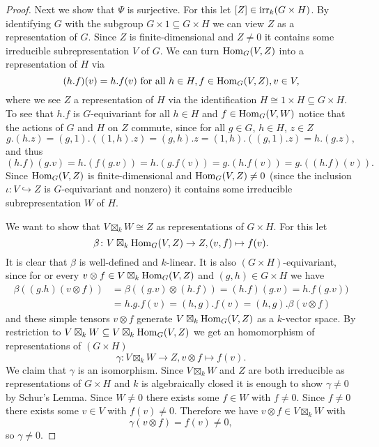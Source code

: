 \begin{proof}
  Next we show that $\Psi$ is surjective.
  For this let $[Z] \in \operatorname{irr}_k(G \times H)$.
  By identifying $G$ with the subgroup $G \times 1 \subseteq G \times H$ we can view $Z$ as a representation of $G$.
  Since $Z$ is finite-dimensional and $Z \neq 0$ it contains some irreducible subrepresentation $V$ of $G$.
  We can turn $\operatorname{Hom}_G(V, Z)$ into a representation of $H$ via
  \[
      (h.f)(v)
    = h.f(v)
    \text{ for all }
    h \in H,
    f \in \operatorname{Hom}_G(V, Z),
    v \in V,
  \]
  where we see $Z$ a representation of $H$ via the identification $H \cong 1 \times H \subseteq G \times H$.
  To see that $h.f$ is $G$-equivariant for all $h \in H$ and $f \in \operatorname{Hom}_G(V,W)$ notice that the actions of $G$ and $H$ on $Z$ commute, since for all $g \in G$, $h \in H$, $z \in Z$
  \[
      g.(h.z)
    = (g,1).((1,h).z)
    = (g,h).z
    = (1,h).((g,1).z)
    = h.(g.z),
  \]
  and thus
  \[
      (h.f)(g.v)
    = h.(f(g.v))
    = h.(g.f(v))
    = g.(h.f(v))
    = g.((h.f)(v)).
  \]
  Since $\operatorname{Hom}_G(V, Z)$ is finite-dimensional and $\operatorname{Hom}_G(V, Z) \neq 0$ (since the inclusion $\iota \colon V \hookrightarrow Z$ is $G$-equivariant and nonzero) it contains some irreducible subrepresentation $W$ of $H$.
  
  We want to show that $V \boxtimes_k W \cong Z$ as representations of $G \times H$.
  For this let
  \[
            \beta
    \colon  V \boxtimes_k \operatorname{Hom}_G(V,Z)
    \to     Z,
            (v, f)
    \mapsto f(v).
  \]
  It is clear that $\beta$ is well-defined and $k$-linear.
  It is also $(G \times H)$-equivariant, since for or every $v \otimes f \in V \boxtimes_k \operatorname{Hom}_G(V,Z)$ and $(g,h) \in G \times H$ we have
  \begin{align*}
        \beta((g.h)(v \otimes f))
    &=  \beta((g.v) \otimes (h.f))
     =  (h.f)(g.v)
     =  h.f(g.v)) \\
    &=  h.g.f(v)
     =  (h,g).f(v)
     =  (h,g).\beta(v \otimes f)
  \end{align*}
  and these simple tensors $v \otimes f$ generate $V \boxtimes_k \operatorname{Hom}_G(V,Z)$ as a $k$-vector space.
  By restriction to $V \boxtimes_k W \subseteq V \boxtimes_k \operatorname{Hom}_G(V,Z)$ we get an homomorphism of representations of $(G \times H)$
  \[
            \gamma
    \colon  V \boxtimes_k W
    \to     Z,
            v \otimes f
    \mapsto f(v).
  \]
  We claim that $\gamma$ is an isomorphism.
  Since $V \boxtimes_k W$ and $Z$ are both irreducible as representations of $G \times H$ and $k$ is algebraically closed it is enough to show $\gamma \neq 0$ by Schur’s Lemma.
  Since $W \neq 0$ there exists some $f \in W$ with $f \neq 0$.
  Since $f \neq 0$ there exists some $v \in V$ with $f(v) \neq 0$.
  Therefore we have $v \otimes f \in V \boxtimes_k W$ with
  \[
          \gamma(v \otimes f)
    =     f(v)
    \neq  0,
  \]
  so $\gamma \neq 0$.
  

\end{proof}
